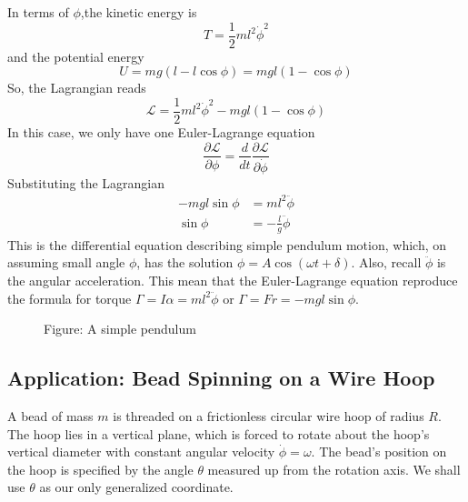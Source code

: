 \documentclass[../../../main.tex]{subfiles}
\begin{document}
In terms of $\phi$,the kinetic energy is 
\begin{equation*}
    T=\frac{1}{2}ml^2\dot{\phi}^2
\end{equation*}
and the potential energy 
\begin{equation*}
    U=mg(l-l\cos\phi)=mgl(1-\cos\phi)
\end{equation*}
So, the Lagrangian reads
\begin{equation*}
    \mathcal{L}=\frac{1}{2}ml^2\dot{\phi}^2-mgl(1-\cos\phi)
\end{equation*}
In this case, we only have one Euler-Lagrange equation
\begin{equation*}
    \frac{\partial\mathcal{L}}{\partial \phi}=\frac{d}{dt}\frac{\partial\mathcal{L}}{\partial \dot{\phi}}
\end{equation*}
Substituting the Lagrangian
\begin{align*}
    -mgl\sin\phi&=ml^2\ddot{\phi}\\
    \sin\phi&=-\frac{l}{g}\ddot{\phi}
\end{align*}
This is the differential equation describing simple pendulum motion, which, on assuming small angle $\phi$, has the solution $\phi=A\cos(\omega t+\delta)$. 
Also, recall $\ddot{\phi}$ is the angular acceleration. 
This mean that the Euler-Lagrange equation reproduce the formula for torque $\Gamma=I\alpha=ml^2\ddot{\phi}$ or $\Gamma=Fr=-mgl\sin\phi$. 

\begin{figure*}
	\centering
	\caption*{Figure: A simple pendulum}
\end{figure*}

\subsection{Application: Bead Spinning on a Wire Hoop}
A bead of mass $m$ is threaded on a frictionless circular wire hoop of radius $R$.
The hoop lies in a vertical plane, which is forced to rotate about the hoop's vertical diameter with constant angular velocity $\dot{\phi} =\omega$.
The bead's position on the hoop is specified by the angle $\theta$ measured up from the rotation axis.
We shall use $\theta$ as our only generalized coordinate.
\end{document}
